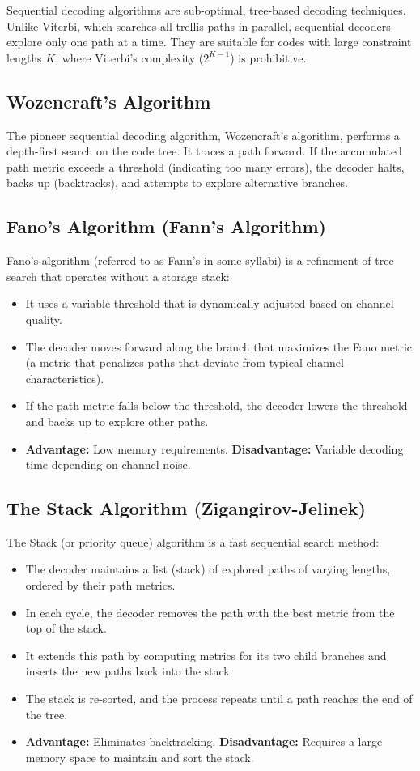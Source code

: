 \documentclass[12pt,a4paper]{article}
\begin{document}
Sequential decoding algorithms are sub-optimal, tree-based decoding techniques. Unlike Viterbi, which searches all trellis paths in parallel, sequential decoders explore only one path at a time. They are suitable for codes with large constraint lengths $K$, where Viterbi's complexity ($2^{K-1}$) is prohibitive.

\subsection{Wozencraft's Algorithm}
The pioneer sequential decoding algorithm, Wozencraft's algorithm, performs a depth-first search on the code tree. It traces a path forward. If the accumulated path metric exceeds a threshold (indicating too many errors), the decoder halts, backs up (backtracks), and attempts to explore alternative branches.

\subsection{Fano's Algorithm (Fann's Algorithm)}
Fano's algorithm (referred to as Fann's in some syllabi) is a refinement of tree search that operates without a storage stack:
\begin{itemize}[leftmargin=*, itemsep=3pt]
  \item It uses a variable threshold that is dynamically adjusted based on channel quality.
  \item The decoder moves forward along the branch that maximizes the Fano metric (a metric that penalizes paths that deviate from typical channel characteristics).
  \item If the path metric falls below the threshold, the decoder lowers the threshold and backs up to explore other paths.
  \item \textbf{Advantage:} Low memory requirements. \textbf{Disadvantage:} Variable decoding time depending on channel noise.
\end{itemize}

\subsection{The Stack Algorithm (Zigangirov-Jelinek)}
The Stack (or priority queue) algorithm is a fast sequential search method:
\begin{itemize}[leftmargin=*, itemsep=3pt]
  \item The decoder maintains a list (stack) of explored paths of varying lengths, ordered by their path metrics.
  \item In each cycle, the decoder removes the path with the best metric from the top of the stack.
  \item It extends this path by computing metrics for its two child branches and inserts the new paths back into the stack.
  \item The stack is re-sorted, and the process repeats until a path reaches the end of the tree.
  \item \textbf{Advantage:} Eliminates backtracking. \textbf{Disadvantage:} Requires a large memory space to maintain and sort the stack.
\end{itemize}
\end{document}
